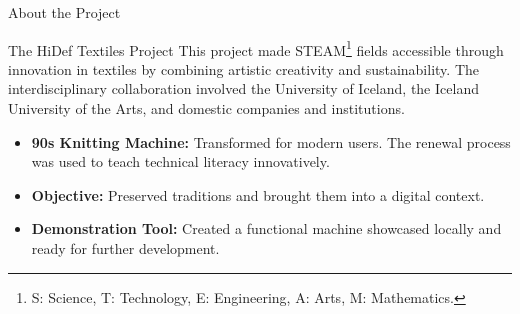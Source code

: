 \documentclass[
    NAME={Dr. Helga Ingimundardóttir},
    EMAIL={helgaingim@hi.is},
    FACULTY={Industrial Engineering},
    TITLE={HiDef Textiles: Reviving Tradition with Innovation},
    SUBTITLE={Empowering Creativity and Sustainability in Textile Production through Digital Transformation},
    SEMINAR={Reykjavík DataBeers},
    DATE={January 25, 2025},
    WIDE={true}
]{HI-LaTeX/hi-beamer}
\begin{document}
\begin{frame}{About the Project}

    \begin{block}{The HiDef Textiles Project}
        This project made STEAM\footnote{S: Science, T: Technology, E: Engineering, A: Arts, M: Mathematics.} fields accessible through innovation in textiles by combining artistic creativity and sustainability. The interdisciplinary collaboration involved the \alert{University of Iceland}, the \alert{Iceland University of the Arts}, and domestic companies and institutions.
    \end{block}

    \begin{itemize}
        \item \textbf{90s Knitting Machine:} Transformed for modern users. The renewal process was used to teach technical literacy innovatively.
        \item \textbf{Objective:} Preserved traditions and brought them into a digital context.
        \item \textbf{Demonstration Tool:} Created a functional machine showcased locally and ready for further development.
    \end{itemize}

\end{frame}
\end{document}
